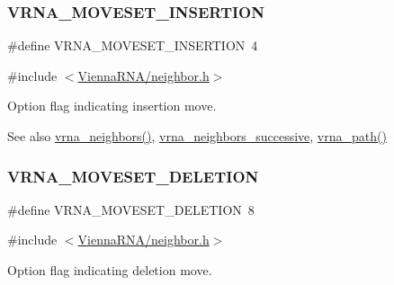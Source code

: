 \subsubsection{\texorpdfstring{V\+R\+N\+A\+\_\+\+M\+O\+V\+E\+S\+E\+T\+\_\+\+I\+N\+S\+E\+R\+T\+I\+ON}{VRNA\_MOVESET\_INSERTION}}
{\footnotesize\ttfamily \#define V\+R\+N\+A\+\_\+\+M\+O\+V\+E\+S\+E\+T\+\_\+\+I\+N\+S\+E\+R\+T\+I\+ON~4}



{\ttfamily \#include $<$\hyperlink{neighbor_8h}{Vienna\+R\+N\+A/neighbor.\+h}$>$}



Option flag indicating insertion move. 

\begin{DoxySeeAlso}{See also}
\hyperlink{group__neighbors_ga249544953933c64a6a5a20b33e3d3bc9}{vrna\+\_\+neighbors()}, \hyperlink{group__neighbors_gae5aaa1c5a1f22e889843f3edbdd04714}{vrna\+\_\+neighbors\+\_\+successive}, \hyperlink{group__paths_ga327c96463d698e7863508499cacce9ab}{vrna\+\_\+path()} 
\end{DoxySeeAlso}
\mbox{\label{group__neighbors_gac05db9392c6647e3e9a6982096c5b384}} 
\subsubsection{\texorpdfstring{V\+R\+N\+A\+\_\+\+M\+O\+V\+E\+S\+E\+T\+\_\+\+D\+E\+L\+E\+T\+I\+ON}{VRNA\_MOVESET\_DELETION}}
{\footnotesize\ttfamily \#define V\+R\+N\+A\+\_\+\+M\+O\+V\+E\+S\+E\+T\+\_\+\+D\+E\+L\+E\+T\+I\+ON~8}



{\ttfamily \#include $<$\hyperlink{neighbor_8h}{Vienna\+R\+N\+A/neighbor.\+h}$>$}



Option flag indicating deletion move. 


